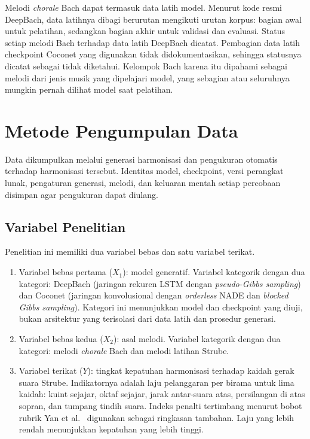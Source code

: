 Melodi \textit{chorale} Bach dapat termasuk data latih model. Menurut kode resmi DeepBach, data latihnya dibagi berurutan mengikuti urutan korpus: bagian awal untuk pelatihan, sedangkan bagian akhir untuk validasi dan evaluasi. Status setiap melodi Bach terhadap data latih DeepBach dicatat. Pembagian data latih checkpoint Coconet yang digunakan tidak didokumentasikan, sehingga statusnya dicatat sebagai tidak diketahui. Kelompok Bach karena itu dipahami sebagai melodi dari jenis musik yang dipelajari model, yang sebagian atau seluruhnya mungkin pernah dilihat model saat pelatihan.

\section{Metode Pengumpulan Data}

Data dikumpulkan melalui generasi harmonisasi dan pengukuran otomatis terhadap harmonisasi tersebut. Identitas model, checkpoint, versi perangkat lunak, pengaturan generasi, melodi, dan keluaran mentah setiap percobaan disimpan agar pengukuran dapat diulang.

\subsection{Variabel Penelitian}

Penelitian ini memiliki dua variabel bebas dan satu variabel terikat.

\begin{enumerate}
    \item Variabel bebas pertama ($X_1$): model generatif. Variabel kategorik dengan dua kategori: DeepBach (jaringan rekuren LSTM dengan \textit{pseudo-Gibbs sampling}) dan Coconet (jaringan konvolusional dengan \textit{orderless} NADE dan \textit{blocked Gibbs sampling}). Kategori ini menunjukkan model dan checkpoint yang diuji, bukan arsitektur yang terisolasi dari data latih dan prosedur generasi.
    \item Variabel bebas kedua ($X_2$): asal melodi. Variabel kategorik dengan dua kategori: melodi \textit{chorale} Bach dan melodi latihan Strube.
    \item Variabel terikat ($Y$): tingkat kepatuhan harmonisasi terhadap kaidah gerak suara Strube. Indikatornya adalah laju pelanggaran per birama untuk lima kaidah: kuint sejajar, oktaf sejajar, jarak antar-suara atas, persilangan di atas sopran, dan tumpang tindih suara. Indeks penalti tertimbang menurut bobot rubrik Yan et al.\ \parencite{yan2018} digunakan sebagai ringkasan tambahan. Laju yang lebih rendah menunjukkan kepatuhan yang lebih tinggi.
\end{enumerate}

